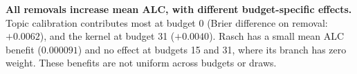 \textbf{All removals increase mean ALC, with different budget-specific effects.} Topic calibration contributes most at budget 0 (Brier difference on removal: $+0.0062$), and the kernel at budget 31 ($+0.0040$). Rasch has a small mean ALC benefit ($0.000091$) and no effect at budgets 15 and 31, where its branch has zero weight. These benefits are not uniform across budgets or draws.
